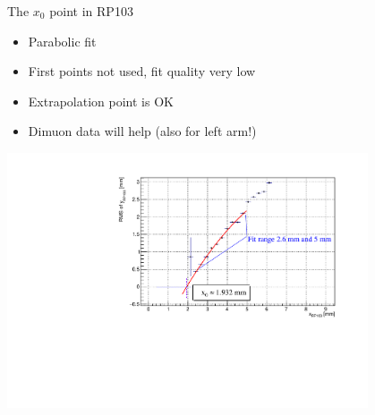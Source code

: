 \documentclass{beamer}
\begin{document}
\begin{frame}\scriptsize
	\begin{block}{The $x_{0}$ point in RP103}
    		\begin{itemize}
			\item Parabolic fit
			\item First points not used, fit quality very low
			\item Extrapolation point is OK
			\item Dimuon data will help (also for left arm!)
		\end{itemize}
		\begin{center}
             \includegraphics[width=0.8\textwidth]{Run_314276/neck_rp_103_variance_fit_meeintg.pdf}
		\end{center}
	\end{block}
	
\end{frame}
\end{document}
